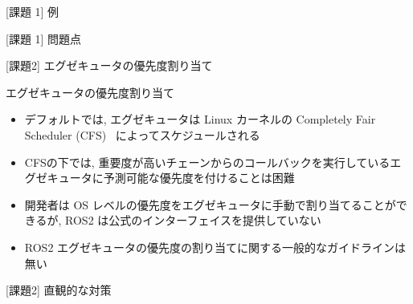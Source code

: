 \begin{frame}{[課題 1] 例}
\end{frame}

\begin{frame}{[課題 1] 問題点}
\end{frame}

\begin{frame}{[課題2] エグゼキュータの優先度割り当て}
    \begin{block}{エグゼキュータの優先度割り当て}
      \setlength{\linewidth}{0.98\columnwidth}
      \begin{itemize}
        \item デフォルトでは, エグゼキュータは Linux カーネルの Completely Fair Scheduler (CFS)~\cite{wong2008fairness} によってスケジュールされる
        \item CFSの下では, 重要度が高いチェーンからのコールバックを実行しているエグゼキュータに予測可能な優先度を付けることは困難
        \item 開発者は OS レベルの優先度をエグゼキュータに手動で割り当てることができるが, ROS2 は公式のインターフェイスを提供していない
        \item ROS2 エグゼキュータの優先度の割り当てに関する一般的なガイドラインは無い
      \end{itemize}
    \end{block}
\end{frame}

\begin{frame}{[課題2] 直観的な対策}
\end{frame}

